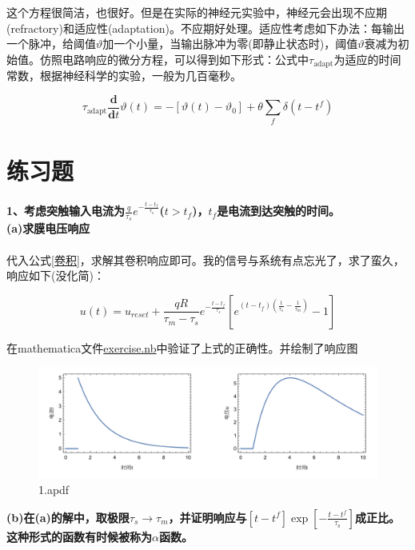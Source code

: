 \documentclass[12pt, a4paper, oneside]{ctexbook}
\begin{document}
这个方程很简洁，也很好。但是在实际的神经元实验中，神经元会出现不应期(refractory)和适应性(adaptation)。不应期好处理。适应性考虑如下办法：每输出一个脉冲，给阈值$\vartheta$加一个小量，当输出脉冲为零(即静止状态时)，阈值$\vartheta$衰减为初始值。仿照电路响应的微分方程，可以得到如下形式：公式中$\tau_{\text{adapt}}$为适应的时间常数，根据神经科学的实验，一般为几百毫秒。

\begin{equation}
    \tau_{\text{adapt}}\frac{\mathbf{d}}{\mathbf{d}t}\vartheta(t)=-[\vartheta(t)-\vartheta_0]+\theta\sum\limits_f\delta(t-t^f)
\end{equation}

\section{练习题}

\textbf{1、考虑突触输入电流为$\frac{q}{\tau_s}e^{-\frac{t-t_f}{\tau_s}}$($t>t_f$)，$t_f$是电流到达突触的时间。}\\
\textbf{(a)求膜电压响应}\\\\
代入公式\ref*{卷积}，求解其卷积响应即可。我的信号与系统有点忘光了，求了蛮久，响应如下(没化简)：

\begin{equation}
    u(t)=u_{reset}+\frac{qR}{\tau_m-\tau_s}e^{-\frac{t-t_f}{\tau_s}}[e^{(t-t_f)(\frac{1}{\tau_s}-\frac{1}{\tau_m})}-1]
    \label{1.a的解}
\end{equation}

在mathematica文件\href{./exercise/exercise.nb}{exercise.nb}中验证了上式的正确性。并绘制了响应图

\begin{figure}[H]
    \centering
    \includegraphics[width=1\textwidth]{exercise/1.a.pdf}
    \caption{1.apdf}
\end{figure}

\textbf{(b)在(a)的解中，取极限$\tau_s\to\tau_m$，并证明响应与$[t-t^{f}]\exp[-\frac{t-t^{f}}{\tau_\text{s}}]$成正比。这种形式的函数有时候被称为$\alpha$函数。}\\\\
\end{document}
